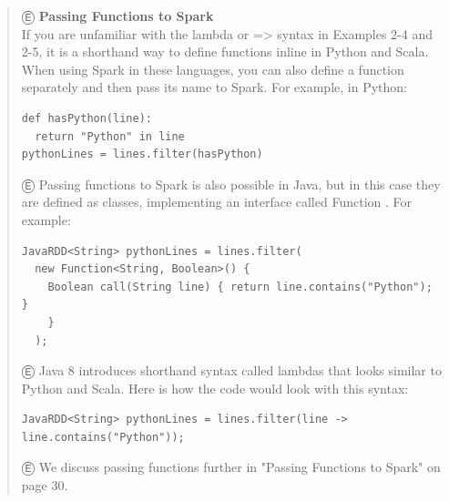 \begin{quote}
Ⓔ \textcolor{etc}{\textbf{Passing Functions to Spark} \\
If you are unfamiliar with the lambda or =\textgreater{} syntax in Examples 2-4 and 2-5, it is a shorthand way to define functions inline in Python and Scala. When using Spark in these languages, you can also define a function separately and then pass its name to Spark. For example, in Python:}

\begin{lstlisting}
def hasPython(line):
  return "Python" in line
pythonLines = lines.filter(hasPython)
\end{lstlisting}

Ⓔ \textcolor{etc}{Passing functions to Spark is also possible in Java, but in this case they are defined as classes, implementing an interface called Function . For example:}

\begin{lstlisting}
JavaRDD<String> pythonLines = lines.filter(
  new Function<String, Boolean>() {
    Boolean call(String line) { return line.contains("Python"); }
    }
  );
\end{lstlisting}

Ⓔ \textcolor{etc}{Java 8 introduces shorthand syntax called lambdas that looks similar to Python and Scala. Here is how the code would look with this syntax:}

\begin{lstlisting}
JavaRDD<String> pythonLines = lines.filter(line -> line.contains("Python"));
\end{lstlisting}

Ⓔ \textcolor{etc}{We discuss passing functions further in "Passing Functions to Spark" on page 30.}
\end{quote}


